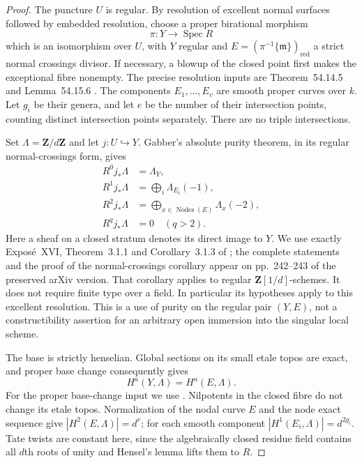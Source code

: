 \begin{proof}
The puncture $U$ is regular. By resolution of excellent normal
surfaces followed by embedded resolution, choose a proper
birational morphism
\[
             \pi:Y\longrightarrow\operatorname{Spec}R
\]
which is an isomorphism over $U$, with $Y$ regular and
$E=(\pi^{-1}\{\mathfrak m\})_{\mathrm{red}}$ a strict normal
crossings divisor. If necessary, a blowup of the closed point
first makes the exceptional fibre nonempty. The precise
resolution inputs are Theorem~54.14.5 and Lemma~54.15.6
\citep[Tags 0BGP and 0BIC]{StacksDSurfaceResolution}.
The components $E_1,\ldots,E_v$ are smooth proper curves over
$k$. Let $g_i$ be their genera, and let $e$ be the number of
their intersection points, counting distinct intersection
points separately. There are no triple intersections.

Set $\Lambda=\mathbf Z/d\mathbf Z$ and let $j:U\hookrightarrow Y$.
Gabber's absolute purity theorem, in its regular normal-crossings
form, gives
\[
 \begin{split}
 R^0j_*\Lambda&=\Lambda_Y,\\
 R^1j_*\Lambda&=\bigoplus_i\Lambda_{E_i}(-1),\\
 R^2j_*\Lambda&=\bigoplus_{x\in\operatorname{Nodes}(E)}
                                      \Lambda_x(-2),\\
 R^qj_*\Lambda&=0\quad(q>2).
 \end{split}                                         \tag{D.LH2.2}
\]
Here a sheaf on a closed stratum denotes its direct image to
$Y$. We use exactly Expos\'e~XVI, Theorem~3.1.1 and
Corollary~3.1.3 of \citet{A_ILO2014}; the complete statements
and the proof of the normal-crossings corollary appear on
pp.~242--243 of the preserved arXiv version. That corollary
applies to regular $\mathbf Z[1/d]$-schemes. It does not
require finite type over a field. In particular its hypotheses
apply to this excellent resolution. This is a use of purity
on the regular pair $(Y,E)$, not a constructibility assertion
for an arbitrary open immersion into the singular local scheme.

The base is strictly henselian. Global sections on its small
etale topos are exact, and proper base change consequently gives
\[
                   H^a(Y,\Lambda)=H^a(E,\Lambda).
\]
For the proper base-change input we use
\citep[Theorems~17.7 and 17.10]{MilneLEC2013H2D}.
Nilpotents in the closed fibre do not change its etale topos.
Normalization of the nodal curve $E$ and the node exact
sequence give $|H^2(E,\Lambda)|=d^v$; for each smooth
component $|H^1(E_i,\Lambda)|=d^{2g_i}$.
Tate twists are constant here, since the algebraically closed
residue field contains all $d$th roots of unity and Hensel's
lemma lifts them to $R$.


\end{proof}
